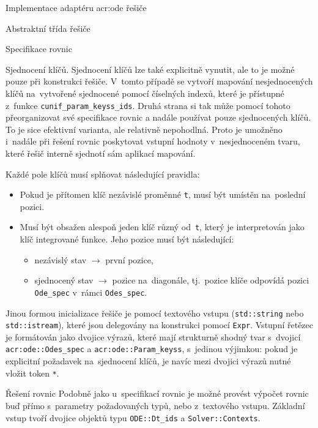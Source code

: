 \documentclass[thesis=M,czech]{FITthesis}[2012/06/26]
\newcommand{\acrlabel}[1]{acr:#1}
\newcommand{\acr}[1]{\acrshort{\acrlabel{#1}}}
\newcommand{\id}[1]{\texttt{#1}}
\begin{document}
\begin{section}{Implementace adaptéru \acr{ode} řešiče}
\begin{subsection}{Abstraktní třída řešiče}
\begin{subsubsection}{Specifikace rovnic}
\begin{paragraph}{Sjednocení klíčů.}
Sjednocení klíčů lze také explicitně vynutit,
ale to je možné pouze při konstrukci řešiče.
V~tomto případě se vytvoří mapování nesjednocených klíčů
na~vytvořené sjednocené pomocí číselných indexů,
které je přístupné z~funkce \id{cunif\_\-param\_\-keyss\_\-ids}.
Druhá strana si tak může pomocí tohoto přeorganizovat
své specifikace rovnic a nadále používat
pouze sjednocených klíčů.
To je sice efektivní varianta, ale relativně nepohodlná.
Proto je umožněno i~nadále při řešení
rovnic poskytovat vstupní hodnoty v~nesjednoceném tvaru,
které řešič interně sjednotí sám aplikací mapování.
\end{paragraph} %


\bigskip

Každé pole klíčů musí splňovat následující pravidla:
\begin{itemize}
\item Pokud je přítomen klíč nezávislé proměnné \id{t},
   musí být umístěn na~poslední pozici.
\item Musí být obsažen alespoň jeden klíč různý od~\id{t},
   který je interpretován jako klíč integrované funkce.
   Jeho pozice musí být následující:
   \begin{itemize}
   \item nezávislý stav $\rightarrow$ první pozice,
   \item sjednocený stav  $\rightarrow$ pozice na~diagonále,
      tj.~pozice klíče odpovídá pozici \id{Ode\_\-spec}
      v~rámci \id{Odes\_\-spec}.
   \end{itemize}
\end{itemize}

Jinou formou inicializace řešiče
je pomocí textového vstupu
(\id{std::\-string} nebo \id{std::\-istream}),
které jsou delegovány na konstrukci pomocí \id{Expr}.
Vstupní řetězec je formátován jako dvojice výrazů,
které mají strukturně shodný tvar
s~dvojicí \id{\acr{ode}::\-Odes\_\-spec}
a \id{\acr{ode}::\-Param\_\-keyss},
s~jedinou výjimkou: pokud je explicitní požadavek
na~sjednocení klíčů, je navíc mezi dvojici výrazů
nutné vložit token \id{*}.
\end{subsubsection} %


\begin{subsubsection}{Řešení rovnic}\label{sss:impl:ode:solver:solve}
Podobně jako u~specifikací rovnic
je možné provést výpočet rovnic
buď přímo s~parametry požadovaných typů,
nebo z~textového vstupu.
Základní vstup tvoří dvojice objektů
typu \id{ODE::\-Dt\_\-ids} a \id{Solver::\-Contexts}.


\end{subsubsection}
\end{subsection}
\end{section}
\end{document}
